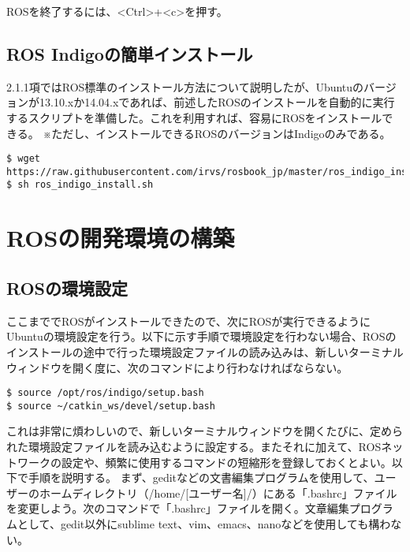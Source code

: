 ROSを終了するには、<Ctrl>+<c>を押す。

\subsection{ROS Indigoの簡単インストール}

2.1.1項ではROS標準のインストール方法について説明したが、Ubuntuのバージョンが13.10.xか14.04.xであれば、前述したROSのインストールを自動的に実行するスクリプトを準備した。これを利用すれば、容易にROSをインストールできる。
※ただし、インストールできるROSのバージョンはIndigoのみである。

\begin{lstlisting}[language=ROS]
$ wget https://raw.githubusercontent.com/irvs/rosbook_jp/master/ros_indigo_install.sh
$ sh ros_indigo_install.sh
\end{lstlisting}

\section{ROSの開発環境の構築}

\subsection{ROSの環境設定}

ここまででROSがインストールできたので、次にROSが実行できるようにUbuntuの環境設定を行う。以下に示す手順で環境設定を行わない場合、ROSのインストールの途中で行った環境設定ファイルの読み込みは、新しいターミナルウィンドウを開く度に、次のコマンドにより行わなければならない。

\begin{lstlisting}[language=ROS]
$ source /opt/ros/indigo/setup.bash
$ source ~/catkin_ws/devel/setup.bash
\end{lstlisting}

これは非常に煩わしいので、新しいターミナルウィンドウを開くたびに、定められた環境設定ファイルを読み込むように設定する。またそれに加えて、ROSネットワークの設定や、頻繁に使用するコマンドの短縮形を登録しておくとよい。以下で手順を説明する。
まず、geditなどの文書編集プログラムを使用して、ユーザーのホームディレクトリ（/home/[ユーザー名]/）にある「.bashrc」ファイルを変更しよう。次のコマンドで「.bashrc」ファイルを開く。文章編集プログラムとして、gedit以外にsublime text、vim、emacs、nanoなどを使用しても構わない。

